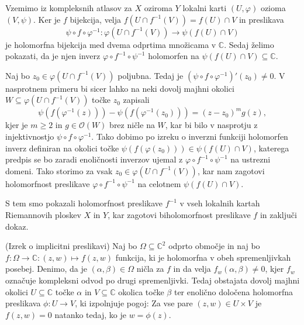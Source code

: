 \documentclass[mat1]{fmfdelo}
\numberwithin{equation}{section}
\newcommand{\C}{\mathbb C}
\newcommand{\inv}{^{-1}}
\newcommand{\hol}[1]{\mathcal{O}(#1)}
\theoremstyle{definition}
\begin{document}
\begin{dokaz}
    Vzemimo iz kompleksnih atlasov za $X$ oziroma $Y$ lokalni karti $(U, \varphi)$ ozioma $(V, \psi)$.
    Ker je $f$ bijekcija, velja $f(U \cap f\inv(V)) = f(U) \cap V$ in preslikava 
    \[
        \psi \circ f \circ \varphi\inv : \varphi(U \cap f\inv(V)) \to \psi(f(U) \cap V)  
    \]
    je holomorfna bijekcija med dvema odprtima množicama v $\C$. Sedaj želimo pokazati, da je njen inverz $\varphi \circ f\inv \circ \psi\inv$ holomorfen na $\psi(f(U) \cap V) \subseteq \C$.

    Naj bo $z_0 \in \varphi(U \cap f\inv(V))$ poljubna. Tedaj je $(\psi \circ f \circ \varphi\inv)'(z_0) \neq 0$. V nasprotnem primeru bi sicer lahko na neki dovolj majhni okolici $W \subseteq \varphi(U \cap f\inv(V))$ točke $z_0$ zapisali 
    \[
        \psi(f(\varphi\inv(z))) - \psi(f(\varphi\inv(z_0))) = (z - z_0)^m g(z),
    \]
    kjer je $m \geq 2$ in $g \in \hol{W}$ brez ničle na $W$, %
    kar bi bilo v nasprotju z injektivnostjo $\psi \circ f \circ \varphi\inv$. Tako dobimo po izreku o inverzni funkciji \cite[Izrek 67]{Globevnik} holomorfen inverz definiran na okolici točke $\psi(f(\varphi(z_0))) \in \psi(f(U) \cap V)$, katerega predpis se bo zaradi enoličnosti inverzov ujemal z $\varphi \circ f\inv \circ \psi\inv$ na ustrezni domeni. Tako storimo za vsak $z_0 \in \varphi(U \cap f\inv(V))$, kar nam zagotovi holomorfnost preslikave $\varphi \circ f\inv \circ \psi\inv$ %
    na celotnem $\psi(f(U) \cap V)$. 
    
    S tem smo pokazali holomorfnost preslikave $f\inv$ v vseh lokalnih kartah Riemannovih ploskev $X$ in $Y$, kar zagotovi biholomorfnost preslikave $f$ in zaključi dokaz. 
\end{dokaz}

\begin{izrek}(Izrek o implicitni preslikavi)
    \label{izrek o impliclitni preslikavi}
    Naj bo $\Omega \subseteq \C^2$ odprto območje in naj bo $f : \Omega \to \C : (z, w) \mapsto f(z,w)$ funkcija, ki je holomorfna v obeh spremenljivkah posebej. Denimo, da je $(\alpha, \beta) \in \Omega$ ničla za $f$ in da velja $f_w(\alpha, \beta) \neq 0$, kjer $f_w$ označuje kompleksni odvod po drugi spremenljivki. Tedaj obstajata dovolj majhni okolici $U \subseteq \C$ točke $\alpha$ in $V \subseteq \C$ okolica točke $\beta$ ter enolično določena holomorfna preslikava $\phi : U \to V$, ki izpolnjuje pogoj: 
    Za vse pare $(z, w) \in U \times V$ je $f(z,w) = 0$ natanko tedaj, ko je $w = \phi(z)$.
    
    

\end{izrek}
\end{document}
